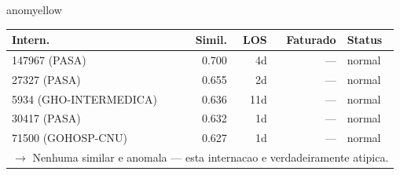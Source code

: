 \documentclass[a4paper,10pt]{article}
\begin{document}
\begin{anomalycard}[Internacao 47723 | GHO-PETROBRAS | MODERADO (z=2.18)]{anomyellow}
\begin{tabular}{l r r r l}\toprule\textbf{Intern.} & \textbf{Simil.} & \textbf{LOS} & \textbf{Faturado} & \textbf{Status} \\\midrule
147967 (PASA) & 0.700 & 4d & --- & \textcolor{jcubeblue}{normal} \\
27327 (PASA) & 0.655 & 2d & --- & \textcolor{jcubeblue}{normal} \\
5934 (GHO-INTERMEDICA) & 0.636 & 11d & --- & \textcolor{jcubeblue}{normal} \\
30417 (PASA) & 0.632 & 1d & --- & \textcolor{jcubeblue}{normal} \\
71500 (GOHOSP-CNU) & 0.627 & 1d & --- & \textcolor{jcubeblue}{normal} \\
\multicolumn{5}{l}{\textcolor{jcubeblue}{\small $\rightarrow$ Nenhuma similar e anomala --- esta internacao e verdadeiramente atipica.}} \\
\bottomrule\end{tabular}


\end{anomalycard}

\newpage
\end{document}
